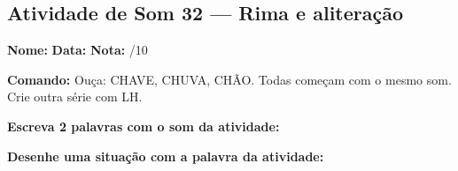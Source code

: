 \subsection{Atividade de Som 32 --- Rima e aliteração}
\begin{exercicio}



\noindent\textbf{Nome:} \underline{\hspace{3.2cm}} \quad \textbf{Data:} \underline{\hspace{1.6cm}} \quad \textbf{Nota:} \underline{\hspace{0.9cm}}/10


\noindent\textbf{Comando:} Ouça: CHAVE, CHUVA, CHÃO. Todas começam com o mesmo som. Crie outra série com LH.


\begin{center}
\end{center}

\noindent\textbf{Escreva 2 palavras com o som da atividade:}

\begin{center}
  \underline{\hspace{3cm}} \quad \underline{\hspace{3cm}}
\end{center}

\noindent\textbf{Desenhe uma situação com a palavra da atividade:}

\begin{center}
\end{center}

\end{exercicio}



